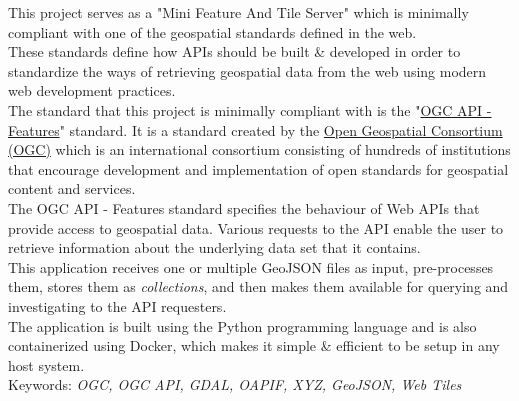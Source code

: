 This project serves as a "Mini Feature And Tile Server" which is minimally compliant with one of the geospatial standards defined in the web.\\
These standards define how APIs should be built \& developed in order to standardize the ways of retrieving geospatial data from the web using modern web development practices.\\
\newline
The standard that this project is minimally compliant with is the "\href{https://docs.opengeospatial.org/is/17-069r3/17-069r3.html}{OGC API - Features}" standard. It is a standard created by the \href{https://www.opengeospatial.org/}{Open Geospatial Consortium (OGC)} which is an international consortium consisting of hundreds of institutions that encourage development and implementation of open standards for geospatial content and services. \\
The OGC API - Features standard specifies the behaviour of Web APIs that provide access to geospatial data. Various requests to the API enable the user to retrieve information about the underlying data set that it contains.\\
This application receives one or multiple GeoJSON files as input, pre-processes them, stores them as \textit{collections}, and then makes them available for querying and investigating to the API requesters.\\

The application is built using the Python programming language and is also containerized using Docker, which makes it simple \& efficient to be setup in any host system.\\
\newline
Keywords: \textit{OGC, OGC API, GDAL, OAPIF, XYZ, GeoJSON, Web Tiles}
